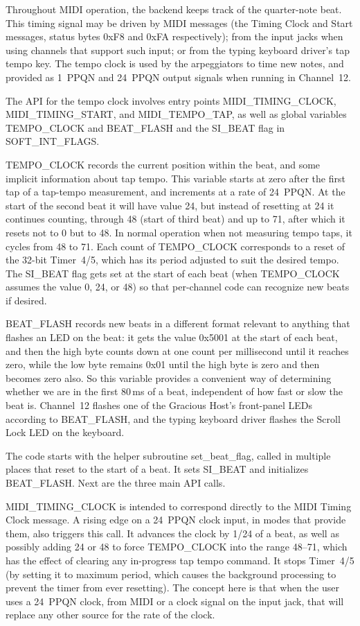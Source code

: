 Throughout MIDI operation, the backend keeps track of the quarter-note beat. 
This timing signal may be driven by MIDI messages (the Timing Clock and
Start messages, status bytes 0xF8 and 0xFA respectively); from the input
jacks when using channels that support such input; or from the typing
keyboard driver's tap tempo key.  The tempo clock is used by the
arpeggiators to time new notes, and provided as 1~PPQN and 24~PPQN output
signals when running in Channel~12.

The API for the tempo clock involves entry points MIDI\_TIMING\_CLOCK,
MIDI\_TIMING\_START, and MIDI\_TEMPO\_TAP, as well as global variables
TEMPO\_CLOCK and BEAT\_FLASH and the SI\_BEAT flag in SOFT\_INT\_FLAGS.

TEMPO\_CLOCK records the current position within the beat, and some implicit
information about tap tempo.  This variable starts at zero after the first
tap of a tap-tempo measurement, and increments at a rate of 24~PPQN.  At the
start of the second beat it will have value 24, but instead of resetting at
24 it continues counting, through 48 (start of third beat) and up to 71,
after which it resets not to 0 but to 48.  In normal operation when not
measuring tempo taps, it cycles from 48 to 71.  Each count of TEMPO\_CLOCK
corresponds to a reset of the 32-bit Timer~4/5, which has its period
adjusted to suit the desired tempo.  The SI\_BEAT flag gets set at the start
of each beat (when TEMPO\_CLOCK assumes the value 0, 24, or 48) so that
per-channel code can recognize new beats if desired.

BEAT\_FLASH records new beats in a different format relevant to anything
that flashes an LED on the beat: it gets the value 0x5001 at the start of
each beat, and then the high byte counts down at one count per millisecond
until it reaches zero, while the low byte remains 0x01 until the high byte
is zero and then becomes zero also.  So this variable provides a convenient
way of determining whether we are in the first 80\,ms of a beat,
independent of how fast or slow the beat is.  Channel~12 flashes one of the
Gracious Host's front-panel LEDs according to BEAT\_FLASH, and the typing
keyboard driver flashes the Scroll Lock LED on the keyboard.

The code starts with the helper subroutine set\_beat\_flag, called in
multiple places that reset to the start of a beat.  It sets SI\_BEAT and
initializes BEAT\_FLASH.  Next are the three main API calls. 

MIDI\_TIMING\_CLOCK is intended to correspond directly to the MIDI Timing
Clock message.  A rising edge on a 24~PPQN clock input, in modes that
provide them, also triggers this call.  It advances the clock by 1/24 of a
beat, as well as possibly adding 24 or 48 to force TEMPO\_CLOCK into the
range 48--71, which has the effect of clearing any in-progress tap tempo
command.  It stops Timer~4/5 (by setting it to maximum period, which causes
the background processing to prevent the timer from ever resetting).  The
concept here is that when the user uses a 24~PPQN clock, from MIDI or a clock
signal on the input jack, that will replace any other source for the rate of
the clock.

